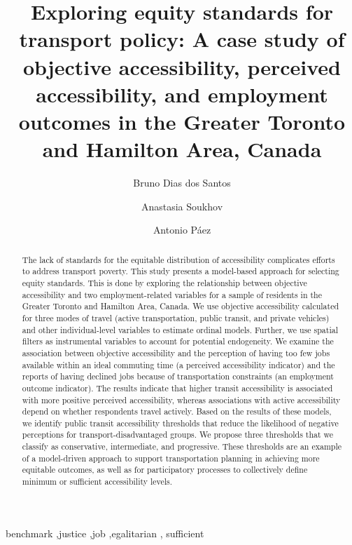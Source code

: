 \documentclass[preprint, 3p,
authoryear]{elsarticle} %
\begin{document}
\begin{frontmatter}

  \title{Exploring equity standards for transport policy: A case study
of objective accessibility, perceived accessibility, and employment
outcomes in the Greater Toronto and Hamilton Area, Canada}
    \author[McMaster University]{Bruno Dias dos Santos%
  }
    \author[Western University]{Anastasia Soukhov%
  }
    \author[McMaster University]{Antonio Páez%
  }
  
  \begin{abstract}
  The lack of standards for the equitable distribution of accessibility
  complicates efforts to address transport poverty. This study presents
  a model-based approach for selecting equity standards. This is done by
  exploring the relationship between objective accessibility and two
  employment-related variables for a sample of residents in the Greater
  Toronto and Hamilton Area, Canada. We use objective accessibility
  calculated for three modes of travel (active transportation, public
  transit, and private vehicles) and other individual-level variables to
  estimate ordinal models. Further, we use spatial filters as
  instrumental variables to account for potential endogeneity. We
  examine the association between objective accessibility and the
  perception of having too few jobs available within an ideal commuting
  time (a perceived accessibility indicator) and the reports of having
  declined jobs because of transportation constraints (an employment
  outcome indicator). The results indicate that higher transit
  accessibility is associated with more positive perceived
  accessibility, whereas associations with active accessibility depend
  on whether respondents travel actively. Based on the results of these
  models, we identify public transit accessibility thresholds that
  reduce the likelihood of negative perceptions for
  transport-disadvantaged groups. We propose three thresholds that we
  classify as conservative, intermediate, and progressive. These
  thresholds are an example of a model-driven approach to support
  transportation planning in achieving more equitable outcomes, as well
  as for participatory processes to collectively define minimum or
  sufficient accessibility levels.
  \end{abstract}
    \begin{keyword}
    benchmark \sep justice \sep job \sep egalitarian \sep 
    sufficient
  \end{keyword}
  
 \end{frontmatter}
\end{document}
